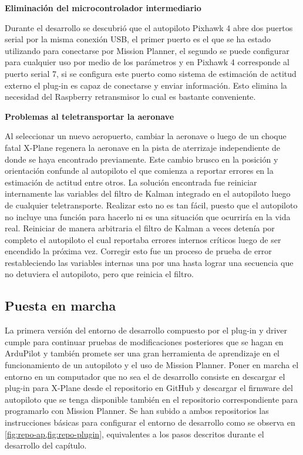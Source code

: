 \textbf{Eliminación del microcontrolador intermediario}

Durante el desarrollo se descubrió que el autopiloto Pixhawk 4 abre dos puertos serial por la misma conexión USB, el primer puerto es el que se ha estado utilizando para conectarse por Mission Planner, el segundo se puede configurar para cualquier uso por medio de los parámetros y en Pixhawk 4 corresponde al puerto serial 7, si se configura este puerto como sistema de estimación de actitud externo el plug-in es capaz de conectarse y enviar información. Esto elimina la necesidad del Raspberry retransmisor lo cual es bastante conveniente.

\textbf{Problemas al teletransportar la aeronave}

Al seleccionar un nuevo aeropuerto, cambiar la aeronave o luego de un choque fatal X-Plane regenera la aeronave en la pista de aterrizaje independiente de donde se haya encontrado previamente. Este cambio brusco en la posición y orientación confunde al autopiloto el que comienza a reportar errores en la estimación de actitud entre otros. La solución encontrada fue reiniciar internamente las variables del filtro de Kalman integrado en el autopiloto luego de cualquier teletransporte. Realizar esto no es tan fácil, puesto que el autopiloto no incluye una función para hacerlo ni es una situación que ocurriría en la vida real. Reiniciar de manera arbitraria el filtro de Kalman a veces detenía por completo el autopiloto el cual reportaba errores internos críticos luego de ser encendido la próxima vez. Corregir esto fue un proceso de prueba de error restableciendo las variables internas una por una hasta lograr una secuencia que no detuviera el autopiloto, pero que reinicia el filtro.

\subsection{Puesta en marcha}

La primera versión del entorno de desarrollo compuesto por el plug-in y driver cumple para continuar pruebas de modificaciones posteriores que se hagan en ArduPilot y también promete ser una gran herramienta de aprendizaje en el funcionamiento de un autopiloto y el uso de Mission Planner. Poner en marcha el entorno en un computador que no sea el de desarrollo consiste en descargar el plug-in para X-Plane desde el repositorio en GitHub \cite{xplane-hitl-plugin} y descargar el firmware del autopiloto que se tenga disponible también en el repositorio correspondiente \cite{ap-hitl-fork} para programarlo con Mission Planner. Se han subido a ambos repositorios las instrucciones básicas para configurar el entorno de desarrollo como se observa en \cref{fig:repo-ap,fig:repo-plugin}, equivalentes a los pasos descritos durante el desarrollo del capítulo.

